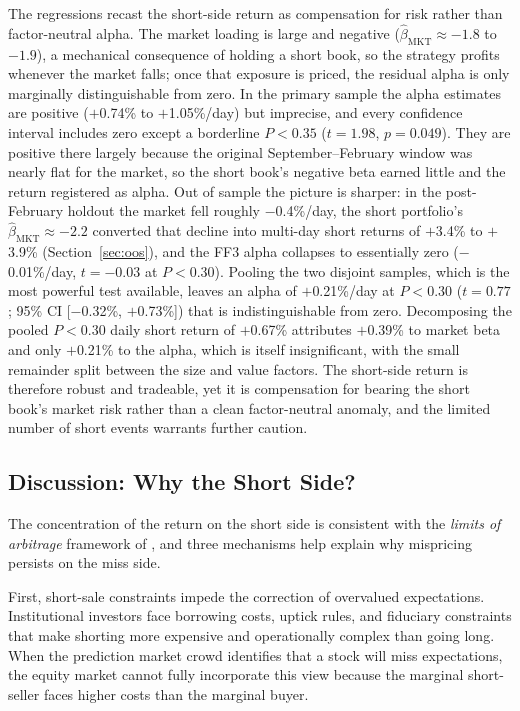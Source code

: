 \documentclass[11pt]{article}
\begin{document}
The regressions recast the short-side return as compensation for risk rather than factor-neutral alpha. The market loading is large and negative ($\hat{\beta}_{\text{MKT}} \approx -1.8$ to $-1.9$), a mechanical consequence of holding a short book, so the strategy profits whenever the market falls; once that exposure is priced, the residual alpha is only marginally distinguishable from zero. In the primary sample the alpha estimates are positive ($+$0.74\% to $+$1.05\%/day) but imprecise, and every confidence interval includes zero except a borderline $P < 0.35$ ($t = 1.98$, $p = 0.049$). They are positive there largely because the original September--February window was nearly flat for the market, so the short book's negative beta earned little and the return registered as alpha. Out of sample the picture is sharper: in the post-February holdout the market fell roughly $-$0.4\%/day, the short portfolio's $\hat{\beta}_{\text{MKT}} \approx -2.2$ converted that decline into multi-day short returns of $+$3.4\% to $+$3.9\% (Section~\ref{sec:oos}), and the FF3 alpha collapses to essentially zero ($-$0.01\%/day, $t = -0.03$ at $P < 0.30$). Pooling the two disjoint samples, which is the most powerful test available, leaves an alpha of $+$0.21\%/day at $P < 0.30$ ($t = 0.77$; 95\% CI [$-$0.32\%, $+$0.73\%]) that is indistinguishable from zero. Decomposing the pooled $P < 0.30$ daily short return of $+$0.67\% attributes $+$0.39\% to market beta and only $+$0.21\% to the alpha, which is itself insignificant, with the small remainder split between the size and value factors. The short-side return is therefore robust and tradeable, yet it is compensation for bearing the short book's market risk rather than a clean factor-neutral anomaly, and the limited number of short events warrants further caution.

\subsection{Discussion: Why the Short Side?}

The concentration of the return on the short side is consistent with the \textit{limits of arbitrage} framework of \citet{shleifer1997limits}, and three mechanisms help explain why mispricing persists on the miss side.

First, short-sale constraints impede the correction of overvalued expectations. Institutional investors face borrowing costs, uptick rules, and fiduciary constraints that make shorting more expensive and operationally complex than going long. When the prediction market crowd identifies that a stock will miss expectations, the equity market cannot fully incorporate this view because the marginal short-seller faces higher costs than the marginal buyer.
\end{document}
